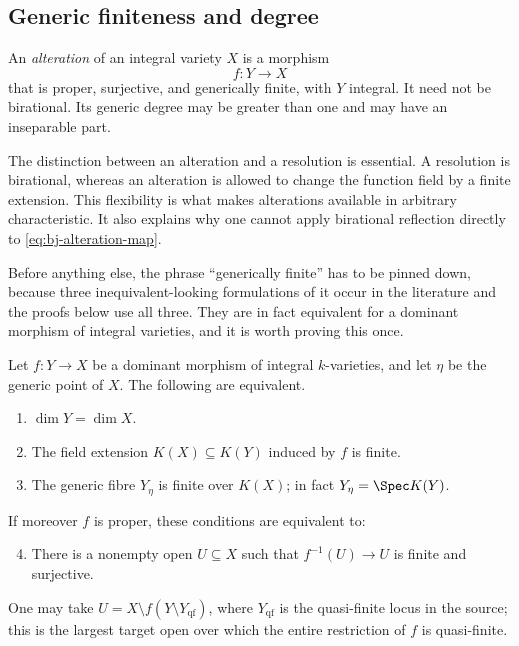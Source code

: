 \subsection{Generic finiteness and degree}
\label{sec:ch42-generic-degree}

\begin{definition}[Alteration]
\label{def:bj-alteration}
An \emph{alteration} of an integral variety $X$ is a morphism
\[
                         f:Y\longrightarrow X
\tag{42.1}\label{eq:bj-alteration-map}
\]
that is proper, surjective, and generically finite, with $Y$ integral.
It need not be birational.
Its generic degree may be greater than one and may have an inseparable part.
\end{definition}

The distinction between an alteration and a resolution is essential.
A resolution is birational, whereas an alteration is allowed to change the
function field by a finite extension.
This flexibility is what makes alterations available in arbitrary
characteristic.
It also explains why one cannot apply birational reflection directly to
\eqref{eq:bj-alteration-map}.

Before anything else, the phrase ``generically finite'' has to be pinned
down, because three inequivalent-looking formulations of it occur in the
literature and the proofs below use all three.  They are in fact equivalent
for a dominant morphism of integral varieties, and it is worth proving this
once.

\begin{lemma}
\label{lem:ch42-generic-finite}
Let $f:Y\to X$ be a dominant morphism of integral $k$-varieties, and let
$\eta$ be the generic point of $X$.  The following are equivalent.
\begin{enumerate}
\item\label{itm:ch42-gf:dim} $\dim Y=\dim X$.
\item\label{itm:ch42-gf:field} The field extension
      $K(X)\subseteq K(Y)$ induced by $f$ is finite.
\item\label{itm:ch42-gf:fibre} The generic fibre $Y_\eta$ is finite over
      $K(X)$; in fact $Y_\eta=\Spec K(Y)$.
\end{enumerate}
If moreover $f$ is proper, these conditions are equivalent to:
\begin{enumerate}
\setcounter{enumi}{3}
\item\label{itm:ch42-gf:open} There is a nonempty open $U\subseteq X$ such
      that $f^{-1}(U)\to U$ is finite and surjective.
\end{enumerate}
One may take $U=X\setminus f(Y\setminus Y_{\mathrm{qf}})$,
where $Y_{\mathrm{qf}}$ is the quasi-finite locus in the source;
this is the largest target open over which the entire restriction
of $f$ is quasi-finite.
\end{lemma}


